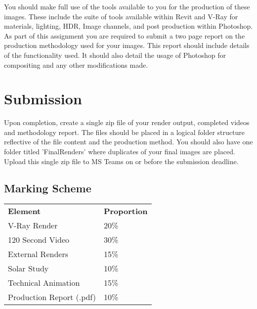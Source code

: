 You should make full use of the tools available to you for the production of these images.  These include the suite of tools available within Revit and V-Ray for materials, lighting, HDR, Image channels, and post production within Photoshop.\\

As part of this assignment you are required to submit a two page report on the production methodology used for your images.  This report should include details of the functionality used. It should also detail the usage of Photoshop for compositing and any other modifications made. \\




\section*{Submission}
Upon completion, create a single zip file of your render output, completed videos and methodology report.  The files should be placed in a logical folder structure reflective of the file content and the production method.  You should also have one folder titled 'FinalRenders' where duplicates of your final images are placed.  Upload this single zip file to MS Teams on or before the submission deadline.

\subsection*{Marking Scheme}

\begin{table}[h!]
	\begin{center}
		\begin{tabular}{p{5cm}  p{5cm} }
			\toprule
			\textbf{Element} & \textbf{Proportion} \\ 
			\cmidrule(r){1-1}\cmidrule(lr){2-2}
			V-Ray Render & 20\%\\
			120 Second Video & 30\%\\
			External Renders & 15\%\\
			Solar Study & 10\%\\
			Technical Animation & 15\%\\
			Production Report (.pdf) & 10\%
			\\ \bottomrule
		\end{tabular}
		\label{tbl:markSchemeAsmt3}
	\end{center}
\end{table}




